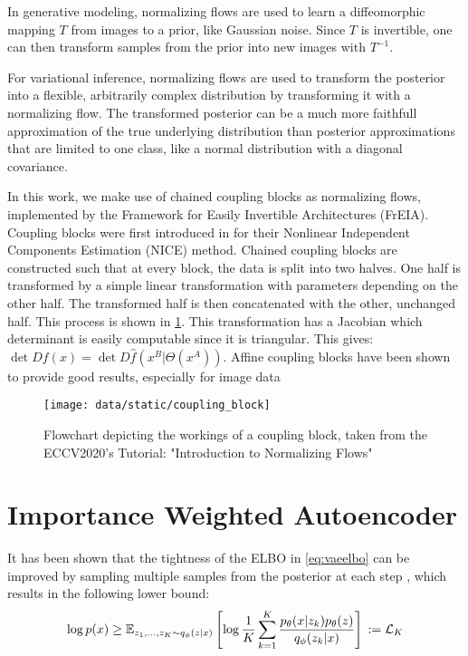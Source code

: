 In generative modeling, normalizing flows are used to learn a diffeomorphic mapping $T$ from images to a prior, like Gaussian noise.
Since $T$ is invertible, one can then transform samples from the prior into new images with $T^{-1}$.

For variational inference, normalizing flows are used to transform the posterior into a flexible, arbitrarily complex distribution by transforming it with a normalizing flow.
The transformed posterior can be a much more faithfull approximation of the true underlying distribution than posterior approximations that are limited to one class, like a normal distribution with a diagonal covariance.

In this work, we make use of chained coupling blocks as normalizing flows, implemented by the Framework for Easily Invertible Architectures (FrEIA).
Coupling blocks were first introduced in \citep{dinh_nice_2015} for their Nonlinear Independent Components Estimation (NICE) method.
Chained coupling blocks are constructed such that at every block, the data is split into two halves.
One half is transformed by a simple linear transformation with parameters depending on the other half.
The transformed half is then concatenated with the other, unchanged half.
This process is shown in \cref{fig:coupling block}.
This transformation has a Jacobian which determinant is easily computable since it is triangular.
This gives: $\det Df(x) = \det D\hat{f}(x^B | \Theta (x^A))$.
Affine coupling blocks have been shown to provide good results, especially for image data \citep{dinh_density_2017}

\begin{figure}
    \centering
    \texttt{[image: data/static/coupling\_block]}
    \caption{Flowchart depicting the workings of a coupling block, taken from the ECCV2020's Tutorial: "Introduction to Normalizing Flows" \citep{coupling_blocks}}
    \label{fig:coupling block}
\end{figure}



\section{Importance Weighted Autoencoder} \label{subsec:iwvae}
It has been shown that the tightness of the ELBO in \cref{eq:vaeelbo} can be improved by sampling multiple samples from the posterior at each step \parencite{burda_importance_2016}, which results in the following lower bound:
\begin{equation}
    \label{eq:iwelbo}
    \log p(x) \geq \mathbb{E}_{z_1,\ldots,z_K \sim q_{\phi}(z|x)}\left[ \log \frac{1}{K} \sum ^K _{k=1} \frac{p_{\theta}(x|z_k)p_{\theta}(z)}{q_{\phi}(z_k| x)} \right]\\
    := \mathcal{L}_K
\end{equation}

